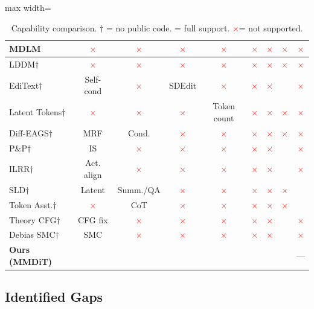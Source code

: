 \documentclass{article}
\newcommand{\gc}{\checkmark}
\newcommand{\rx}{\textcolor{red}{$\times$}}
\begin{document}
\begin{table}[h]
\begin{adjustbox}{max width=\textwidth}
\begin{tabular}{@{}lcccccccc@{}}
MDLM & \rx & \rx & \rx & \rx & \rx & \rx & \rx & \rx \\
\midrule
LDDM$\dagger$ & \rx & \rx & \rx & \rx & \rx & \rx & \rx & \rx \\
EdiText$\dagger$ & Self-cond & \rx & \gc SDEdit & \rx & \rx & \rx & \gc & \rx \\
Latent Tokens$\dagger$ & \rx & \rx & \rx & Token count & \rx & \rx & \rx & \rx \\
Diff-EAGS$\dagger$ & MRF & \gc Cond. & \rx & \rx & \rx & \rx & \rx & \rx \\
P\&P$\dagger$ & IS & \rx & \rx & \rx & \rx & \rx & \gc & \rx \\
ILRR$\dagger$ & Act. align & \rx & \rx & \rx & \rx & \rx & \gc & \rx \\
SLD$\dagger$ & Latent & Summ./QA & \rx & \rx & \rx & \rx & \rx & \gc \\
Token Asst.$\dagger$ & \rx & CoT & \rx & \rx & \rx & \rx & \rx & \gc \\
Theory CFG$\dagger$ & CFG fix & \rx & \rx & \rx & \rx & \rx & \gc & \rx \\
Debias SMC$\dagger$ & SMC & \rx & \rx & \rx & \rx & \rx & \gc & \rx \\
\midrule
\textbf{Ours (MMDiT)} & \textbf{\gc} & \textbf{\gc} & \textbf{\gc} & \textbf{\gc} & \textbf{\gc} & \textbf{\gc} & \textbf{\gc} & --- \\
\bottomrule
\end{tabular}
\end{adjustbox}
\caption{Capability comparison. $\dagger$ = no public code. \gc = full support. \rx = not supported.}
\end{table}

\subsection{Identified Gaps}
\end{document}
